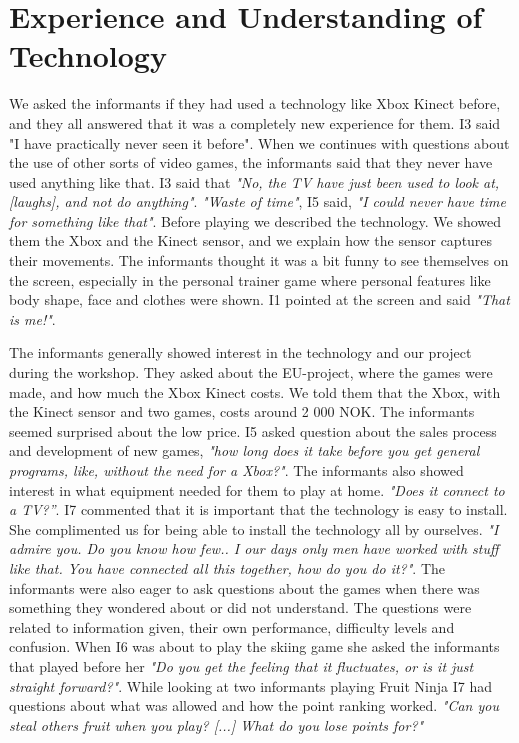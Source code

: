 \section{Experience and Understanding of Technology}
We asked the informants if they had used a technology like Xbox Kinect before, and they all answered that it was a completely new experience for them. I3 said "I have practically never seen it before". When we continues with questions about the use of other sorts of video games, the informants said that they never have used anything like that. I3 said that \emph{"No, the TV have just been used to look at, [laughs], and not do anything"}. \emph{"Waste of time"}, I5 said, \emph{"I could never have time for something like that"}.  Before playing we described the technology. We showed them the Xbox and the Kinect sensor, and we explain how the sensor captures their movements. The informants thought it was a bit funny to see themselves on the screen, especially in the personal trainer game where personal features like body shape, face and clothes were shown. I1 pointed at the screen and said \emph{"That is me!"}. 

The informants generally showed interest in the technology and our project during the workshop. They asked about the EU-project, where the games were made, and how much the Xbox Kinect costs. We told them that the Xbox, with the Kinect sensor and two games, costs around 2 000 NOK. The informants seemed surprised about the low price. I5 asked question about the sales process and development of new games, \emph{"how long does it take before you get general programs, like, without the need for a Xbox?"}. The informants also showed interest in what equipment needed for them to play at home. \emph{"Does it connect to a TV?”}. I7 commented that it is important that the technology is easy to install. She complimented us for being able to install the technology all by ourselves. \emph{"I admire you. Do you know how few.. I our days only men have worked with stuff like that. You have connected all this together, how do you do it?"}.  The informants were also eager to ask questions about the games when there was something they wondered about or did not understand. The questions were related to information given, their own performance, difficulty levels and confusion. When I6 was about to play the skiing game she asked the informants that played before her \emph{"Do you get the feeling that it fluctuates, or is it just straight forward?"}. While looking at two informants playing Fruit Ninja I7 had questions about what was allowed and how the point ranking worked. \emph{"Can you steal others fruit when you play? [...] What do you lose points for?"} 

